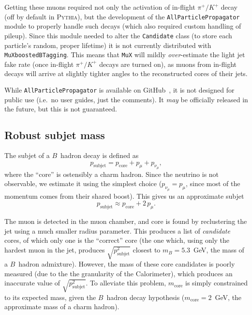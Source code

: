 \documentclass[10pt]{article}
\newcommand{\muXmodFull}{\texttt{MuXboostedBTagging}}
\newcommand{\muXmod}{\texttt{MuX}}
\newcommand{\pSubjet}[1][] {p_{\mathrm{subjet}}^{#1}}
\newcommand{\pCore}[1][]   {p_{\mathrm{core}}^{#1}}
\newcommand{\pMu}[1][]     {p_{\mu}^{#1}}
\newcommand{\pNu}[1][]     {p_{\nu_{\mu}}^{#1}}
\newcommand{\mB}             {m_{B}^{}}
\newcommand{\mCore}[1][]     {m_{\mathrm{core}}^{#1}}
\begin{document}
Getting these muons required not only the activation of in-flight 
$\pi^{+}/K^{+}$ decay (off by default in \textsc{Pythia}), but the development 
of the \texttt{AllParticlePropagator} module to properly handle such decays 
(which also required custom handling of pileup). Since this module needed to 
alter the \texttt{Candidate} class (to store each particle's random, proper 
lifetime) it is not currently distributed with {\muXmodFull}. This means that 
{\muXmod} will mildly \emph{over}-estimate the light jet fake rate (once 
in-flight $\pi^{+}/K^{+}$ decays are turned on), as muons from in-flight decays 
will arrive at slightly tighter angles to the reconstructed cores of their jets.

While \texttt{AllParticlePropagator} is available on
GitHub~\cite{Pedersen:myDelphes}, it is not designed for public use 
(i.e.\ no user guides, just the comments). It \emph{may} be officially released 
in the future, but this is not guaranteed.

\subsection{Robust subjet mass}

The subjet of a $B$~hadron decay is defined as
%
\begin{equation}
\pSubjet=\pCore+\pMu+\pNu,
\end{equation}
%
where the ``core'' is ostensibly a charm hadron.
Since the neutrino is not observable, we estimate it using the
simplest choice ($\pNu=\pMu$, since most of the momentum comes from
their shared boost). This gives us an approximate subjet
%
\begin{equation}
\pSubjet\approx\pCore+2\,\pMu.
\end{equation}
%

The muon is detected in the muon chamber, and core is found by reclustering the 
jet using a much smaller radius parameter. This produces a list of 
\emph{candidate} cores, of which only one is the ``correct'' core (the 
one which, using only the hardest muon in the jet, produces $\sqrt{\pSubjet[2]}$
closest to $\mB=5.3$~GeV, the mass of a $B$~hadron admixture). 
However, the mass of these core candidates is poorly measured (due
to the the granularity of the Calorimeter), which produces an inaccurate
value of $\sqrt{\pSubjet[2]}$. To alleviate this problem, $\mCore$ is simply
constrained to its expected mass, given the $B$~hadron decay hypothesis 
($\mCore=2$~GeV, the approximate mass of a charm hadron). 
\end{document}
